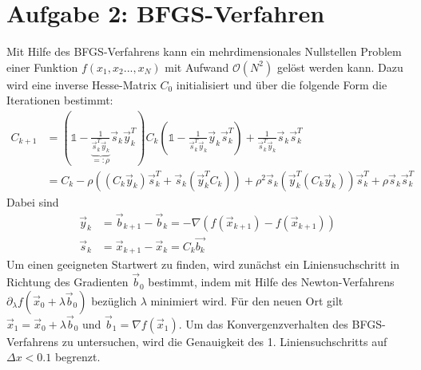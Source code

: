 \section*{Aufgabe 2: BFGS-Verfahren}

Mit Hilfe des BFGS-Verfahrens kann ein mehrdimensionales Nullstellen Problem einer Funktion $f(x_1,x_2...,x_N)$ mit Aufwand $\mathcal{O}(N^2)$ gelöst werden kann.
Dazu wird eine inverse Hesse-Matrix $C_0$ initialisiert und über die folgende Form die Iterationen bestimmt:
\begin{align*}
C_{k+1} &= (\mathds{1} - \underbrace{\frac{1}{\vec{s}_k^T\vec{y}_k}}_{=:\rho}\vec{s}_k\vec{y}_k^T)C_k(\mathds{1}-\frac{1}{\vec{s}_k^T\vec{y}_k}\vec{y}_k\vec{s}_k^T) +\frac{1}{\vec{s}_k^T\vec{y}_k}\vec{s}_k\vec{s}_k^T\\
&= C_k - \rho ((C_k\vec{y}_k)\vec{s}_k^T + \vec{s}_k(\vec{y}_k^TC_k)) + \rho^2\vec{s}_k(\vec{y}_k^T(C_k\vec{y}_k))\vec{s}_k^T +\rho\vec{s}_k\vec{s}_k^T
\end{align*}
Dabei sind
\begin{align*}
\vec{y}_k &= \vec{b}_{k+1} - \vec{b}_k = -\nabla(f(\vec{x}_{k+1})-f(\vec{x}_{k+1}))\\
\vec{s}_k &= \vec{x}_{k+1} - \vec{x}_k = C_k \vec{b_{k}}
\end{align*}
Um einen geeigneten Startwert zu finden, wird zunächst ein Liniensuchschritt in Richtung des Gradienten $\vec{b}_0$ bestimmt, indem mit Hilfe des Newton-Verfahrens $\partial_{\lambda}f(\vec{x}_0+\lambda\vec{b}_0)$ bezüglich $\lambda$ minimiert wird. Für den neuen Ort gilt $\vec{x}_{1} = \vec{x}_0+\lambda\vec{b}_0$ und $\vec{b}_1= \nabla f(\vec{x}_1)$. Um das Konvergenzverhalten des BFGS-Verfahrens zu untersuchen, wird die Genauigkeit des 1. Liniensuchschritts auf $\Delta x < 0.1$ begrenzt.
